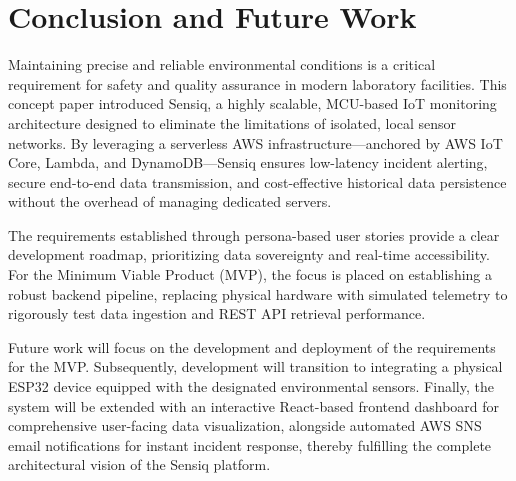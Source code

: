 \documentclass[conference,a4paper,flushend]{cs-techrep} %
\begin{document}
\section{Conclusion and Future Work}\label{sec:conclusion}

Maintaining precise and reliable environmental conditions is a critical requirement for safety and quality assurance 
in modern laboratory facilities. This concept paper introduced Sensiq, a highly scalable, MCU-based IoT monitoring 
architecture designed to eliminate the limitations of isolated, local sensor networks. By leveraging a serverless 
AWS infrastructure—anchored by AWS IoT Core, Lambda, and DynamoDB—Sensiq ensures low-latency incident alerting, 
secure end-to-end data transmission, and cost-effective historical data persistence without the overhead of managing 
dedicated servers.

The requirements established through persona-based user stories provide a clear development roadmap, prioritizing 
data sovereignty and real-time accessibility. For the Minimum Viable Product (MVP), the focus is placed on 
establishing a robust backend pipeline, replacing physical hardware with simulated telemetry to rigorously test 
data ingestion and REST API retrieval performance.

Future work will focus on the development and deployment of the requirements for the MVP.
Subsequently, development will transition to integrating a physical ESP32 device equipped with the designated 
environmental sensors. 
Finally, the system will be extended with an interactive React-based frontend dashboard for comprehensive 
user-facing data visualization, 
alongside automated AWS SNS email notifications for instant incident response, thereby fulfilling the complete 
architectural vision of the Sensiq platform.

\sloppy
\printbibliography[notcategory=selfref]
\end{document}
